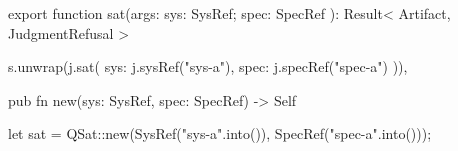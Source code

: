 \begin{tssrc}
export function sat(args: { sys: SysRef; spec: SpecRef }): Result<
  Artifact,
  JudgmentRefusal
>
\end{tssrc}
\begin{tssrc}
s.unwrap(j.sat({ sys: j.sysRef("sys-a"), spec: j.specRef("spec-a") })),
\end{tssrc}
\begin{rustsrc}
pub fn new(sys: SysRef, spec: SpecRef) -> Self
\end{rustsrc}
\begin{rustsrc}
let sat = QSat::new(SysRef("sys-a".into()), SpecRef("spec-a".into()));
\end{rustsrc}
